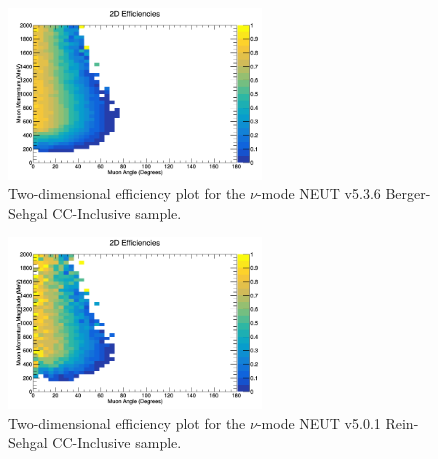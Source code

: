 \documentclass[11pt]{article}
\begin{document}
\begin{figure}[H]
\centering
\includegraphics[width=0.6\textwidth]{CCInclusivePlots/2DEffCompareNMBS.png}
\caption{Two-dimensional efficiency plot for the $\nu$-mode NEUT v5.3.6 Berger-Sehgal CC-Inclusive sample.}
\label{fig:app:NMCCInclusiveMuon2DEffBS}
\end{figure}

\begin{figure}[H]
\centering
\includegraphics[width=0.6\textwidth]{CCInclusivePlots/2DEffCompareNMORS.png}
\caption{Two-dimensional efficiency plot for the $\nu$-mode NEUT v5.0.1 Rein-Sehgal CC-Inclusive sample.}
\label{fig:app:NMCCInclusiveMuon2DEffORS}
\end{figure}
\end{document}
